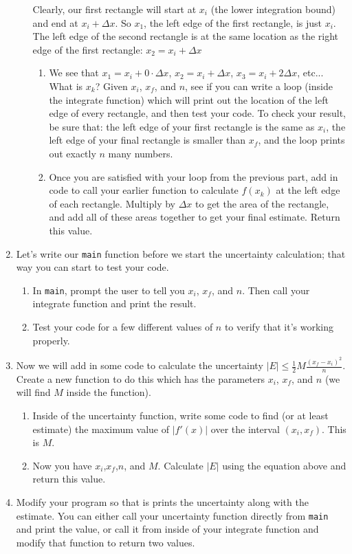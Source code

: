 \documentclass{article}
\begin{document}
\begin{enumerate}
\begin{enumerate}
		Clearly, our first rectangle will start at $x_i$ (the lower integration bound) and end at $x_i+\Delta x$. So $x_1$, the left edge of the first rectangle, is just $x_i$. The left edge of the second rectangle is at the same location as the right edge of the first rectangle: $x_2=x_i+\Delta x$
		\begin{enumerate}
			\item We see that $x_1=x_i+0\cdot\Delta x$, $x_2=x_i+\Delta x$, $x_3=x_i+2\Delta x$, etc... What is $x_k$? Given $x_i$, $x_f$, and $n$, see if you can write a loop (inside the integrate function) which will print out the location of the left edge of every rectangle, and then test your code. To check your result, be sure that: the left edge of your first rectangle is the same as $x_i$, the left edge of your final rectangle is smaller than $x_f$, and the loop prints out exactly $n$ many numbers.
			\item Once you are satisfied with your loop from the previous part, add in code to call your earlier function to calculate $f(x_k)$ at the left edge of each rectangle. Multiply by $\Delta x$ to get the area of the rectangle, and add all of these areas together to get your final estimate. Return this value.
		\end{enumerate}
	\end{enumerate}
	\item Let's write our \texttt{main} function before we start the uncertainty calculation; that way you can start to test your code.
	\begin{enumerate}
		\item In \texttt{main}, prompt the user to tell you $x_i$, $x_f$, and $n$. Then call your integrate function and print the result.
		\item Test your code for a few different values of $n$ to verify that it's working properly.
	\end{enumerate}
	\item Now we will add in some code to calculate the uncertainty $|E|\leq\frac{1}{2}M\frac{(x_f-x_i)^2}{n}$. Create a new function to do this which has the parameters $x_i$, $x_f$, and $n$ (we will find $M$ inside the function).
	\begin{enumerate}
		\item Inside of the uncertainty function, write some code to find (or at least estimate) the maximum value of $|f'(x)|$ over the interval $(x_i,x_f)$. This is $M$.
		\item Now you have $x_i$,$x_f$,$n$, and $M$. Calculate $|E|$ using the equation above and return this value.
	\end{enumerate}
	\item Modify your program so that is prints the uncertainty along with the estimate. You can either call your uncertainty function directly from \texttt{main} and print the value, or call it from inside of your integrate function and modify that function to return two values.
\end{enumerate}
\end{document}
